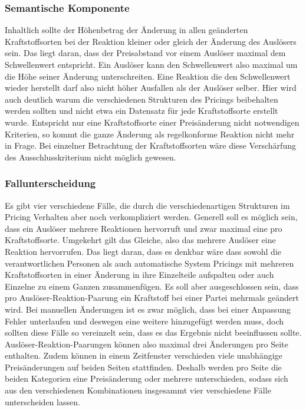 \documentclass[12pt,a4paper,bibliography=totocnumbered,listof=totocnumbered]{scrartcl}
\begin{document}
\subsubsection{Semantische Komponente}
Inhaltlich sollte der Höhenbetrag der Änderung in allen geänderten Kraftstoffsorten bei der Reaktion kleiner oder gleich der Änderung des Auslösers sein. Das liegt daran, dass der Preisabstand vor einem Auslöser maximal dem Schwellenwert entspricht. Ein Auslöser kann den Schwellenwert also maximal um die Höhe seiner Änderung unterschreiten. Eine Reaktion die den Schwellenwert wieder herstellt darf also nicht höher Ausfallen als der Auslöser selber. Hier wird auch deutlich warum die verschiedenen Strukturen des Pricings beibehalten werden sollten und nicht etwa ein Datensatz für jede Kraftstoffsorte erstellt wurde. Entspricht nur eine Kraftstoffsorte einer Preisänderung nicht notwendigen Kriterien, so kommt die ganze Änderung als regelkonforme Reaktion nicht mehr in Frage. Bei einzelner Betrachtung der Kraftstoffsorten wäre diese Verschärfung des Ausschlusskriterium nicht möglich gewesen.\\

\subsubsection{Fallunterscheidung}
Es gibt vier verschiedene Fälle, die durch die verschiedenartigen Strukturen im Pricing Verhalten aber noch verkompliziert werden. Generell soll es möglich sein, dass ein Auslöser mehrere Reaktionen hervorruft und zwar maximal eine pro Kraftstoffsorte. Umgekehrt gilt das Gleiche, also das mehrere Auslöser eine Reaktion hervorrufen. Das liegt daran, dass es denkbar wäre dass sowohl die verantwortlichen Personen als auch automatische System Pricings mit mehreren Kraftstoffsorten in einer Änderung in ihre Einzelteile aufspalten oder auch Einzelne zu einem Ganzen zusammenfügen. Es soll aber ausgeschlossen sein, dass pro Auslöser-Reaktion-Paarung ein Kraftstoff bei einer Partei mehrmals geändert wird. Bei manuellen Änderungen ist es zwar möglich, dass bei einer Anpassung Fehler unterlaufen und deswegen eine weitere hinzugefügt werden muss, doch sollten diese Fälle so vereinzelt sein, dass es das Ergebnis nicht beeinflussen sollte. Auslöser-Reaktion-Paarungen können also maximal drei Änderungen pro Seite enthalten. Zudem können in einem Zeitfenster verschieden viele unabhängige Preisänderungen auf beiden Seiten stattfinden. Deshalb werden pro Seite die beiden Kategorien eine Preisänderung oder mehrere unterschieden, sodass sich aus den verschiedenen Kombinationen insgesammt vier verschiedene Fälle unterscheiden lassen. 
\end{document}
